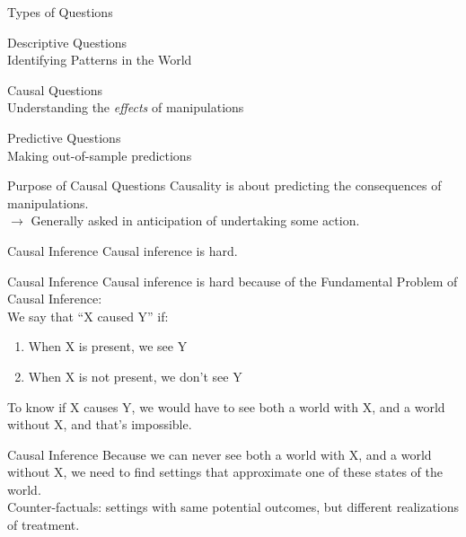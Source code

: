 \documentclass[11pt]{beamer}
\begin{document}
\begin{frame}[c]{Types of Questions}
  \begin{enumerate}
    {\color{gray} \item {Descriptive Questions} \\
    {\color{gray} Identifying Patterns in the World} }
    \item \alert{Causal Questions} \\
    {\color{gray} Understanding the \emph{effects} of manipulations}
    {\color{gray} \item Predictive Questions \\
    {\color{gray} Making out-of-sample predictions} }
  \end{enumerate}
\end{frame}

\begin{frame}[c]{Purpose of Causal Questions}
  \pause Causality is about predicting the consequences of \alert{manipulations}.  \\
\pause $\rightarrow$ Generally asked in anticipation of undertaking some action. 
  \end{frame}
  
\begin{frame}[c]{Causal Inference}
  \pause Causal inference is \alert{hard}.
\end{frame}

\begin{frame}[c]{Causal Inference}
  Causal inference is hard because of the \alert{Fundamental Problem of Causal Inference:} \\
  \pause We say that ``X caused Y'' if:
  \begin{enumerate}
    \pause \item When X is present, we see Y
    \pause \item When X is not present, we don't see Y
  \end{enumerate}
  \pause To \alert{know} if X causes Y, we would have to see \alert{both} a world with X, and a world without X, and that's impossible. 
\end{frame}

\begin{frame}[c]{Causal Inference}
  Because we can never see \alert{both} a world with X, and a world without X, \pause we need to find settings that \alert{approximate} one of these states of the world. \\
  Counter-factuals: settings with same \alert{potential outcomes}, but different realizations of treatment.
\end{frame}
\end{document}
